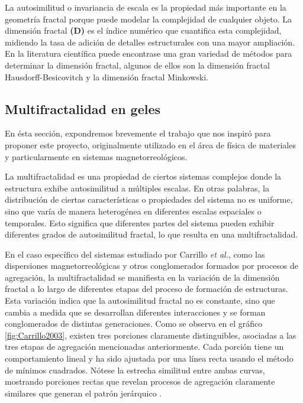 \documentclass[11pt]{article}
\begin{document}
La autosimilitud o invariancia de escala es la propiedad m\'{a}s importante en la geometr\'{i}a fractal porque puede modelar la complejidad de cualquier objeto. La dimensi\'{o}n fractal \textbf{(D)} es el \'{i}ndice num\'{e}rico que cuantifica esta complejidad, midiendo la tasa de adici\'{o}n de detalles estructurales con una mayor ampliaci\'{o}n. En la literatura cient\'{i}fica puede encontrase una gran variedad de m\'{e}todos para determinar la dimensi\'{o}n fractal, algunos de ellos son la dimensi\'{o}n fractal Hausdorff-Besicovitch y la dimensi\'{o}n fractal Minkowski.


\subsection{Multifractalidad en geles}
\label{subsec:subseccion2.2}

En \'{e}sta secci\'{o}n, expondremos brevemente el
trabajo que nos inspir\'{o} para proponer este proyecto, 
originalmente utilizado en el \'{a}rea de f\'{i}sica de materiales 
y particularmente en sistemas magnetorreol\'{o}gicos. 

La multifractalidad es una propiedad de ciertos sistemas
 complejos donde la estructura exhibe autosimilitud a m\'{u}ltiples 
 escalas. En otras palabras, la distribuci\'{o}n de ciertas 
 caracter\'{i}sticas o propiedades del sistema no es uniforme,
  sino que var\'{i}a de manera heterog\'{e}nea en diferentes 
  escalas espaciales o temporales. Esto significa que diferentes
   partes del sistema pueden exhibir diferentes grados de autosimilitud 
   fractal, lo que resulta en una multifractalidad.

En el caso espec\'{i}fico del sistemas estudiado por  
Carrillo \textit{et al.}\cite{Carrillo2003}, como las dispersiones
 magnetorreol\'{o}gicas y otros conglomerados formados 
 por procesos de agregaci\'{o}n, la multifractalidad se 
 manifiesta en la variaci\'{o}n de la dimensi\'{o}n fractal 
 a lo largo de diferentes etapas del proceso de formaci\'{o}n 
 de estructuras. Esta variaci\'{o}n indica que la autosimilitud
  fractal no es constante, sino que cambia a medida que se 
  desarrollan diferentes interacciones y se forman conglomerados 
  de distintas generaciones. Como se observa en el gr\'{a}fico \ref{fig:Carrillo2003},
   existen tres porciones claramente distinguibles, asociadas a las tres etapas 
   de agregaci\'{o}n mencionadas anteriormente. Cada porci\'{o}n tiene un comportamiento lineal y ha sido ajustada por una l\'{i}nea recta usando el m\'{e}todo de m\'{i}nimos cuadrados. N\'{o}tese la estrecha similitud entre ambas curvas, mostrando porciones rectas que revelan procesos de agregaci\'{o}n claramente similares que generan el patr\'{o}n jer\'{a}rquico \cite{Carrillo2003}.
\end{document}
